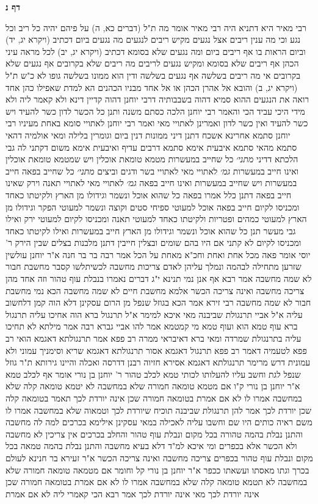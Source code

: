 \documentclass[12pt, openany]{book}
\newcommand{\sethebfont}{
\fontsize{10.5pt}{21.0pt} \selectfont
}
\newcommand{\twocol}[1]{
	{\sethebfont \begin{multicols}{2}
			#1
	\end{multicols}}	
}
\newcommand{\sectname}{}
\newcommand{\newsection}[1]{
	\addcontentsline{toc}{section}{#1}
	\renewcommand{\sectname}{#1}	
	\vspace{-\baselineskip}
	\begin{center}
		\textbf{%
\fontsize{16pt}{16pt}\selectfont
			#1}
	\end{center}
	\vspace{-\baselineskip}
	\nopagebreak
}
\begin{document}
\newsection{דף נ}
\twocol{רבי מאיר היא דתניא היה רבי מאיר אומר מה ת"ל (דברים כא, ה) על פיהם יהיה כל ריב וכל נגע וכי מה ענין ריבים אצל נגעים מקיש ריבים לנגעים מה נגעים ביום דכתיב (ויקרא יג, יד) וביום הראות בו אף ריבים ביום 
ומה נגעים שלא בסומא דכתיב (ויקרא יג, יב) לכל מראה עיני הכהן אף ריבים שלא בסומא ומקיש נגעים לריבים מה ריבים שלא בקרובים אף נגעים שלא בקרובים 
אי מה ריבים בשלשה אף נגעים בשלשה ודין הוא ממונו בשלשה גופו לא כ"ש ת"ל (ויקרא יג, ב) והובא אל אהרן הכהן או אל אחד מבניו הכהנים הא למדת שאפילו כהן אחד רואה את הנגעים 
ההוא סמיא דהוה בשבבותיה דרבי יוחנן דהוה קדיין דינא ולא קאמר ליה ולא מידי היכי עביד הכי והאמר רבי יוחנן הלכה כסתם משנה
ותנן כל הכשר לדון כשר להעיד ויש כשר להעיד ואין כשר לדון ואמרינן לאתויי מאי ואמר רבי יוחנן לאתויי סומא באחת מעיניו 
רבי יוחנן סתמא אחרינא אשכח דתנן דיני ממונות דנין ביום וגומרין בלילה 
ומאי אולמיה דהאי סתמא מהאי סתמא איבעית אימא סתמא דרבים עדיף ואיבעית אימא משום דקתני לה גבי הלכתא דדיני
{\large\emph{מתני׳}} כל שחייב במעשרות מטמא טומאת אוכלין ויש שמטמא טומאת אוכלין ואינו חייב במעשרות
{\large\emph{גמ׳}} לאתויי מאי לאתויי בשר ודגים וביצים
{\large\emph{מתני׳}} כל שחייב בפאה חייב במעשרות ויש שחייב במעשרות ואינו חייב בפאה
{\large\emph{גמ׳}} לאתויי מאי לאתויי תאנה וירק שאינו חייב בפאה דתנן כלל אמרו בפאה כל שהוא אוכל ונשמר וגידולו מן הארץ ולקיטתו כאחד ומכניסו לקיום חייב בפאה 
אוכל למעוטי ספיחי סטים וקוצה ונשמר למעוטי הפקר וגידולו מן הארץ למעוטי כמהים ופטריות ולקיטתו כאחד למעוטי תאנה ומכניסו לקיום למעוטי ירק 
ואילו גבי מעשר תנן כל שהוא אוכל ונשמר וגידולו מן הארץ חייב במעשרות ואילו לקיטתו כאחד ומכניסו לקיום לא קתני 
אם היו בהם שומים ובצלין חייבין דתנן מלבנות בצלים שבין הירק ר' יוסי אומר פאה מכל אחת ואחת וחכ"א מאחת על הכל 
אמר רבה בר בר חנה א"ר יוחנן עולשין שזרען מתחילה לבהמה ונמלך עליהן לאדם
צריכות מחשבה לכשיתלשו קסבר מחשבת חבור לא שמה מחשבה 
אמר רבא אף אנן נמי תנינא י"ג דברים נאמרו בנבלת עוף טהור וזה אחד מהן צריכה מחשבה ואינה צריכה הכשר אלמא מחשבת חיים לא שמה מחשבה הכא נמי מחשבת חבור לא שמה מחשבה 
רבי זירא אמר הכא בגוזל שנפל מן הרום עסקינן דלא הוה קמן דלחשוב עליה 
א"ל אביי תרנגולת שביבנה מאי איכא למימר א"ל תרנגול ברא הוה 
אחיכו עליה תרנגול ברא עוף טמא הוא ועוף טמא מי קמטמא אמר להו אביי גברא רבה אמר מילתא לא תחיכו עליה בתרנגולת שמרדה ומאי ברא דאיבראי ממרה 
רב פפא אמר תרנגולתא דאגמא הואי רב פפא לטעמיה דאמר רב פפא תרנגול דאגמא אסור תרנגולתא דאגמא שריא
וסימניך עמוני ולא עמונית דרש מרימר תרנגולתא דאגמא אסירא חזיוה רבנן דדרסה ואכלה והיינו גירותא 
ת"ר גוזל שנפל לגת וחשב עליו להעלותו לכותי טמא לכלב טהור ר' יוחנן בן נורי אומר אף לכלב טמא 
א"ר יוחנן בן נורי ק"ו אם מטמא טומאה חמורה שלא במחשבה לא יטמא טומאה קלה שלא במחשבה 
אמרו לו לא אם אמרת בטומאה חמורה שכן אינה יורדת לכך תאמר בטומאה קלה שכן יורדת לכך 
אמר להן תרנגולת שביבנה תוכיח שיורדת לכך וטמאוה שלא במחשבה אמרו לו משם ראיה כותים היו שם וחשבו עליה לאכילה 
במאי עסקינן אילימא בכרכים למה לה מחשבה והתנן נבלת בהמה טהורה בכל מקום ונבלת עוף טהור והחלב בכרכים אין צריכין לא מחשבה ולא הכשר 
אלא בכפרים ומי איכא למ"ד דלא בעיא מחשבה והתנן נבלת בהמה טמאה בכל מקום ונבלת עוף טהור בכפרים צריכה מחשבה ואינה צריכה הכשר 
א"ר זעירא בר חנינא לעולם בכרך וגתו מאסתו ועשאתו ככפר 
א"ר יוחנן בן נורי קל וחומר אם מטמאה טומאה חמורה שלא במחשבה לא תטמא טומאה קלה שלא במחשבה 
אמרו לו לא אם אמרת בטומאה חמורה שכן אינה יורדת לכך 
מאי אינה יורדת לכך אמר רבא הכי קאמרי ליה לא אם אמרת}
\end{document}
